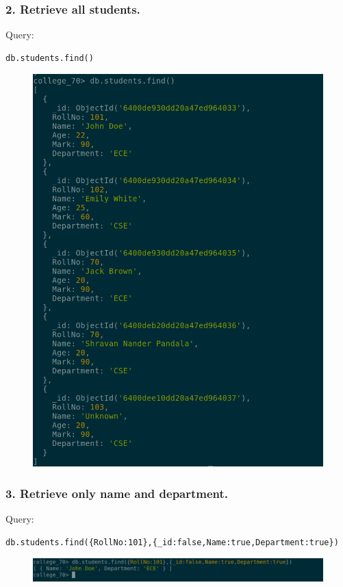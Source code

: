 \documentclass{article}
\begin{document}
\subsubsection*{2. Retrieve all students.}
Query:
\begin{Verbatim}[frame=single,framerule=1pt,fontfamily=courier,fontsize=\small]
db.students.find()
\end{Verbatim}
\begin{figure}[H]
    \centering
    \includegraphics[width=\textwidth]{cycle7/7.2.png}
\end{figure}

\subsubsection*{3. Retrieve only name and department.}
Query:
\begin{Verbatim}[frame=single,framerule=1pt,fontfamily=courier,fontsize=\small]
db.students.find({RollNo:101},{_id:false,Name:true,Department:true})
\end{Verbatim}
\begin{figure}[H]
    \centering
    \includegraphics[width=\textwidth]{cycle7/7.3.png}
\end{figure}
\end{document}
